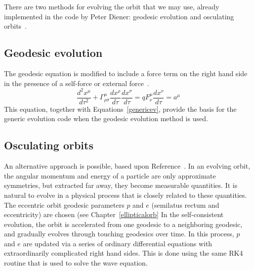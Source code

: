 There are two methods for evolving the orbit that we may use, already implemented in the code by Peter Diener: geodesic evolution and osculating orbits~\cite{pound_poisson}.

\subsection{Geodesic evolution}
The geodesic equation is modified to include a force term on the right hand side in the presence of a self-force or external force~\cite{Carroll}.
\begin{equation}
  \frac{d^2x^\mu}{d\tau^2}+\Gamma^\mu_{\rho\sigma}\frac{dx^\rho}{d\tau}\frac{dx^\sigma}{d\tau}=qF^\mu_\nu\frac{dx^\nu}{d\tau}=a^\mu
\end{equation}
This equation, together with Equations~\ref{genericev}, provide the basis for the generic evolution code when the geodesic evolution method is used. 

\subsection{Osculating orbits}

An alternative approach is possible, based upon Reference~\cite{pound_poisson}. In an evolving orbit, the angular momentum and energy of a particle are only approximate symmetries, but extracted far away, they become measurable quantities. It is natural to evolve in a physical process that is closely related to these quantities. The eccentric orbit geodesic parameters $p$ and $e$ (semilatus rectum and eccentricity) are chosen (see Chapter~\ref{ellipticalorb} In the self-consistent evolution, the orbit is accelerated from one geodesic to a neighboring geodesic, and gradually evolves through touching geodesics over time. In this process, $p$ and $e$ are updated via a series of ordinary differential equations with extraordinarily complicated right hand sides. This is done using the same RK4 routine that is used to solve the wave equation.






